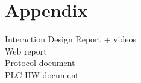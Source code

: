 \chapter{Appendix}
Interaction Design Report + videos
\\Web report
\\Protocol document
\\PLC HW document
